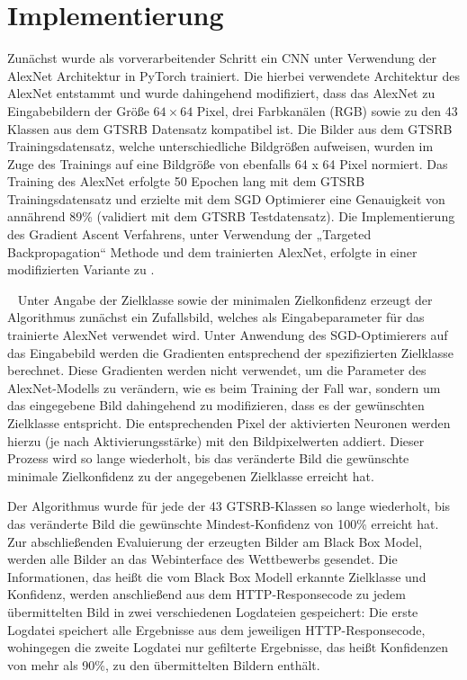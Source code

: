 \section{Implementierung}

Zunächst wurde als vorverarbeitender Schritt ein \ac{CNN} unter Verwendung der AlexNet Architektur in PyTorch trainiert. 
Die hierbei verwendete Architektur des AlexNet entstammt \cite{pytorch_datasets_2019} und wurde dahingehend modifiziert, dass das AlexNet zu Eingabebildern der Größe $64 \times 64$ Pixel, drei Farbkanälen (RGB) sowie zu den 43 Klassen aus dem \ac{GTSRB} Datensatz kompatibel ist. 
Die Bilder aus dem \ac{GTSRB} Trainingsdatensatz, welche unterschiedliche Bildgrößen aufweisen, wurden im Zuge des Trainings auf eine Bildgröße von ebenfalls 64 x 64 Pixel normiert. 
Das Training des AlexNet erfolgte 50 Epochen lang mit dem \ac{GTSRB} Trainingsdatensatz und erzielte mit dem \ac{SGD} Optimierer eine Genauigkeit von annährend 89\% (validiert mit dem \ac{GTSRB} Testdatensatz).
Die Implementierung des Gradient Ascent Verfahrens, unter Verwendung der „Targeted Backpropagation“ Methode und dem trainierten AlexNet, erfolgte in einer modifizierten Variante zu \cite{ozbulak_pytorch_2019}. 

~\newline
Unter Angabe der Zielklasse sowie der minimalen Zielkonfidenz erzeugt der Algorithmus zunächst ein Zufallsbild, welches als Eingabeparameter für das trainierte AlexNet verwendet wird. Unter Anwendung des SGD-Optimierers auf das Eingabebild werden die Gradienten entsprechend der spezifizierten Zielklasse berechnet. 
Diese Gradienten werden nicht verwendet, um die Parameter des AlexNet-Modells zu verändern, wie es beim Training der Fall war, sondern um das eingegebene Bild dahingehend zu modifizieren, dass es der gewünschten Zielklasse entspricht. 
Die entsprechenden Pixel der aktivierten Neuronen werden hierzu (je nach Aktivierungsstärke) mit den Bildpixelwerten addiert. 
Dieser Prozess wird so lange wiederholt, bis das veränderte Bild die gewünschte minimale Zielkonfidenz zu der angegebenen Zielklasse erreicht hat.
~\newline

Der Algorithmus wurde für jede der 43 \ac{GTSRB}-Klassen so lange wiederholt, bis das veränderte Bild die gewünschte Mindest-Konfidenz von 100\% erreicht hat.
Zur abschließenden Evaluierung der erzeugten Bilder am Black Box Model, werden alle Bilder an das Webinterface des Wettbewerbs gesendet. Die Informationen, das heißt die vom Black Box Modell erkannte Zielklasse und Konfidenz, werden anschließend aus dem HTTP-Responsecode zu jedem übermittelten Bild in zwei verschiedenen Logdateien gespeichert: Die erste Logdatei speichert alle Ergebnisse aus dem jeweiligen HTTP-Responsecode, wohingegen die zweite Logdatei nur gefilterte Ergebnisse, das heißt Konfidenzen von mehr als 90\%, zu den übermittelten Bildern enthält.




